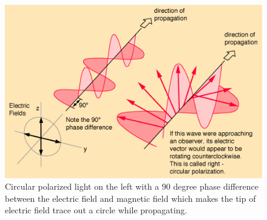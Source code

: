 \documentclass[ notitlepage, numerical, 11pt]{revtex4-1} %
\begin{document}
\begin{figure}[H]
\centerline{\includegraphics[scale=.7]{polcir.png}}
\caption{Circular polarized light on the left with a 90 degree phase difference between the electric field and magnetic field which makes the tip of electric field trace out a circle while propagating\cite{wikiPic}.}
\label{circular}
\end{figure} 
\end{document}
